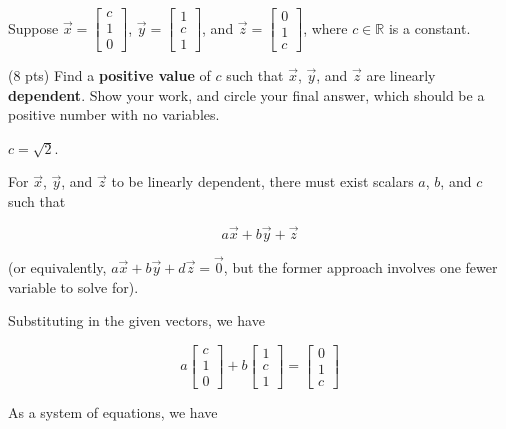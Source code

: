 \documentclass[11pt]{article}
\begin{document}
\newpage

\begin{prob}
Suppose $\vec x = \begin{bmatrix} c \\ 1 \\ 0 \end{bmatrix}$, $\vec y = \begin{bmatrix} 1 \\ c \\ 1 \end{bmatrix}$, and $\vec z = \begin{bmatrix} 0 \\ 1 \\ c \end{bmatrix}$, where $c \in \mathbb{R}$ is a constant.

\begin{subprob}(8 pts) Find a \textbf{positive value} of $c$ such that $\vec x$, $\vec y$, and $\vec z$ are linearly \textbf{dependent}. Show your work, and $\boxed{\text{circle}}$ your final answer, which should be a positive number with no variables. \\

\emptybox{15cm}

\begin{solution}
$c = \sqrt{2}$.

For $\vec x$, $\vec y$, and $\vec z$ to be linearly dependent, there must exist scalars $a$, $b$, and $c$ such that

$$a \vec x + b \vec y + \vec z$$

(or equivalently, $a \vec x + b \vec y + d\vec z = \vec 0$, but the former approach involves one fewer variable to solve for).

Substituting in the given vectors, we have

$$a \begin{bmatrix} c \\ 1 \\ 0 \end{bmatrix} + b \begin{bmatrix} 1 \\ c \\ 1 \end{bmatrix} = \begin{bmatrix} 0 \\ 1 \\ c \end{bmatrix}$$

As a system of equations, we have


\end{solution}
\end{subprob}
\end{prob}
\end{document}
